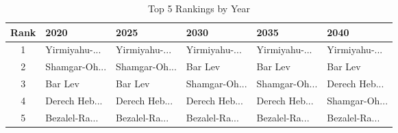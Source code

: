 \begin{table}[H]
\centering
\caption{Top 5 Rankings by Year}
\label{tab:temporal}
\begin{tabular}{@{}clllll@{}}
\toprule
\textbf{Rank} & \textbf{2020} & \textbf{2025} & \textbf{2030} & \textbf{2035} & \textbf{2040} \\
\midrule
1 & Yirmiyahu-... & Yirmiyahu-... & Yirmiyahu-... & Yirmiyahu-... & Yirmiyahu-... \\
2 & Shamgar-Oh... & Shamgar-Oh... & Bar Lev & Bar Lev & Bar Lev \\
3 & Bar Lev & Bar Lev & Shamgar-Oh... & Shamgar-Oh... & Derech Heb... \\
4 & Derech Heb... & Derech Heb... & Derech Heb... & Derech Heb... & Shamgar-Oh... \\
5 & Bezalel-Ra... & Bezalel-Ra... & Bezalel-Ra... & Bezalel-Ra... & Bezalel-Ra... \\
\bottomrule
\end{tabular}
\end{table}
